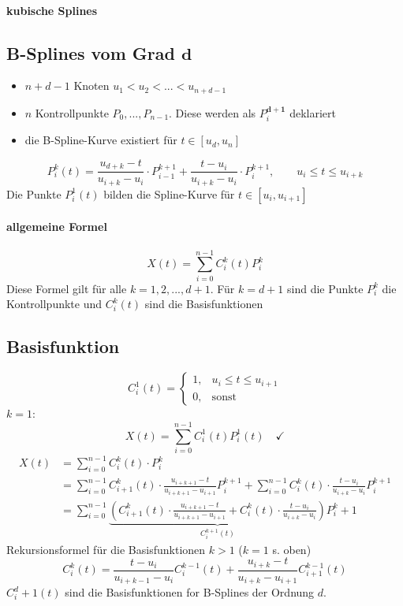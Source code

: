 \paragraph*{kubische Splines}
\begin{center}
\end{center}

\subsection{B-Splines vom Grad $\boldsymbol{d}$}
\begin{itemize}
 \item $n+d-1$ Knoten $u_1 < u_2 < ... < u_{n+d-1}$
 \item $n$ Kontrollpunkte $P_0, ..., P_{n-1}$. Diese werden als $P_i^{\boldsymbol{d+1}}$ deklariert
 \item die B-Spline-Kurve existiert für $t \in [u_d, u_n]$
	\begin{center}
	\end{center}
\end{itemize}
\[\boxed{P_i^k(t) = \frac{u_{d+k}-t}{u_{i+k}-u_i} \cdot P_{i-1}^{k+1} + \frac{t-u_i}{u_{i+k}-u_i} \cdot P_i^{k+1}},
	\qquad u_i \le t \le u_{i+k}\]
Die Punkte $P^1_i(t)$ bilden die Spline-Kurve für $t \in [u_i, u_{i+1}]$
\paragraph*{allgemeine Formel}
\[X(t) = \sum\limits_{i=0}^{n-1} C_i^k(t) P_i^k\]
Diese Formel gilt für alle $k = 1, 2, ..., d+1$. Für $k = d+1$ sind die Punkte $P_i^k$ die Kontrollpunkte und
$C_i^k(t)$ sind die Basisfunktionen

\subsection{Basisfunktion}
\begin{center}
\end{center}
\[\boxed{C_i^1(t) = \begin{cases}
           1, & u_i \le t \le u_{i+1}\\
           0, & \text{sonst}
          \end{cases}}
\]
$k = 1$:
\[X(t) = \sum\limits_{i=0}^{n-1} C^1_i(t) P^1_i(t) \quad \checkmark\]
\begin{align*}
 X(t) &= \sum\limits_{i=0}^{n-1} C_i^k(t) \cdot P_i^k\\
	&= \sum\limits_{i=0}^{n-1} C_{i+1}^k(t) \cdot \frac{u_{i+k+1} - t}{u_{i+k+1} - u_{i+1}} P_{i}^{k+1}
		+ \sum\limits_{i=0}^{n-1} C_{i}^k(t) \cdot \frac{t-u_{i}}{u_{i+k} - u_i} P_{i}^{k+1}\\
	&= \sum\limits_{i=0}^{n-1} \underbrace{\left(C_{i+1}^k(t) \cdot \frac{u_{i+k+1} - t}{u_{i+k+1} - u_{i+1}}
		+ C_{i}^k(t) \cdot \frac{t-u_{i}}{u_{i+k} - u_i} \right)}_{C_i^{k+1}(t)} P_i^k+1
\end{align*}
Rekursionsformel für die Basisfunktionen $k > 1$ ($k = 1$ s. oben)
\[\boxed{C_i^k(t) = \frac{t-u_{i}}{u_{i+k-1} - u_i} C_i^{k-1}(t) + \frac{u_{i+k}-t}{u_{i+k} - u_{i+1}} C_{i+1}^{k-1}(t)}\]
$C_i^d+1(t)$ sind die Basisfunktionen for B-Splines der Ordnung $d$.

